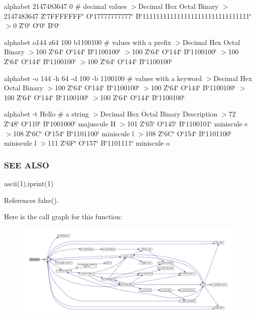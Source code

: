 alphabet 2147483647 0 \# decimal values $>$Decimal Hex Octal Binary $>$2147483647 Z\char`\"{}7\+F\+F\+F\+F\+F\+F\+F\char`\"{} O\char`\"{}17777777777\char`\"{} B\char`\"{}1111111111111111111111111111111\char`\"{} $>$0 Z\char`\"{}0\char`\"{} O\char`\"{}0\char`\"{} B\char`\"{}0\char`\"{}

alphabet o144 z64 100 b1100100 \# values with a prefix $>$Decimal Hex Octal Binary $>$100 Z\char`\"{}64\char`\"{} O\char`\"{}144\char`\"{} B\char`\"{}1100100\char`\"{} $>$100 Z\char`\"{}64\char`\"{} O\char`\"{}144\char`\"{} B\char`\"{}1100100\char`\"{} $>$100 Z\char`\"{}64\char`\"{} O\char`\"{}144\char`\"{} B\char`\"{}1100100\char`\"{} $>$100 Z\char`\"{}64\char`\"{} O\char`\"{}144\char`\"{} B\char`\"{}1100100\char`\"{}

alphabet -\/o 144 -\/h 64 -\/d 100 -\/b 1100100 \# values with a keyword $>$Decimal Hex Octal Binary $>$100 Z\char`\"{}64\char`\"{} O\char`\"{}144\char`\"{} B\char`\"{}1100100\char`\"{} $>$100 Z\char`\"{}64\char`\"{} O\char`\"{}144\char`\"{} B\char`\"{}1100100\char`\"{} $>$100 Z\char`\"{}64\char`\"{} O\char`\"{}144\char`\"{} B\char`\"{}1100100\char`\"{} $>$100 Z\char`\"{}64\char`\"{} O\char`\"{}144\char`\"{} B\char`\"{}1100100\char`\"{}

alphabet -\/t Hello \# a string $>$Decimal Hex Octal Binary Description $>$72 Z\char`\"{}48\char`\"{} O\char`\"{}110\char`\"{} B\char`\"{}1001000\char`\"{} majuscule H $>$101 Z\char`\"{}65\char`\"{} O\char`\"{}145\char`\"{} B\char`\"{}1100101\char`\"{} miniscule e $>$108 Z\char`\"{}6\+C\char`\"{} O\char`\"{}154\char`\"{} B\char`\"{}1101100\char`\"{} miniscule l $>$108 Z\char`\"{}6\+C\char`\"{} O\char`\"{}154\char`\"{} B\char`\"{}1101100\char`\"{} miniscule l $>$111 Z\char`\"{}6\+F\char`\"{} O\char`\"{}157\char`\"{} B\char`\"{}1101111\char`\"{} miniscule o

\subsubsection*{S\+EE A\+L\+SO}

ascii(1),iprint(1) 

References false().

Here is the call graph for this function\+:
\nopagebreak
\begin{figure}[H]
\begin{center}
\leavevmode
\includegraphics[width=350pt]{alphabet_8f90_a39c21619b08a3c22f19e2306efd7f766_cgraph}
\end{center}
\end{figure}
\mbox{\label{alphabet_8f90_aa1b7d174dbbe1ca1d92bf00b80724012}} 

